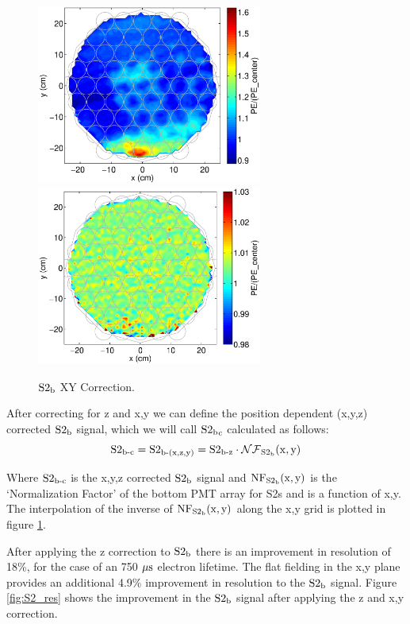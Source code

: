 \begin{figure}[h!]\centering
\includegraphics[width=74mm]{Chapter_XYZ_Corr/Thesis_Corr_Plots/S2_b_1cm_1cm/S2_b_XY_1cm_norm.eps}
\includegraphics[width=74mm]{Chapter_XYZ_Corr/Thesis_Corr_Plots/S2_b_1cm_1cm/S2_b_XY_1cm_norm_FlatField.eps}
\caption{$\rm S2_b$ XY Correction. }
\label{fig:S2_XY_norm_center}
\end{figure}


After correcting for z and x,y we can define the position dependent  (x,y,z) corrected $\rm S2_b$ signal, which we will call $\rm S2{_b}_c$ calculated as follows:
\begin{equation}
\rm S2_{\operatorname{b-c}}= S2_{\operatorname{b-(x,z,y)}}=S2_{\operatorname{b-z}} \cdot \mathcal{NF}_{S2_b}(x,y)
\label{eq:S2_XYZ}
\end{equation}

Where $\rm S2_{\operatorname{b-c}}$ is the x,y,z corrected $\rm S2_b$ signal and $\rm NF_{S2_b}(x,y)$ is the `Normalization Factor' of the bottom PMT array for S2s and is a function of x,y. The interpolation of the inverse of $\rm NF_{S2_b}(x,y)$ along the x,y grid is plotted in figure \ref{fig:S2_XY_norm_center}.


After applying the z correction to $\rm S2_b$ there is an improvement in resolution of 18\%, for the case of an 750 $\rm \mu s$ electron lifetime. The flat fielding in the x,y plane provides an additional 4.9\% improvement in resolution to the $\rm S2_b$ signal. Figure \ref{fig:S2_res} shows the improvement in the $\rm S2_b$ signal after applying the z and x,y correction.

